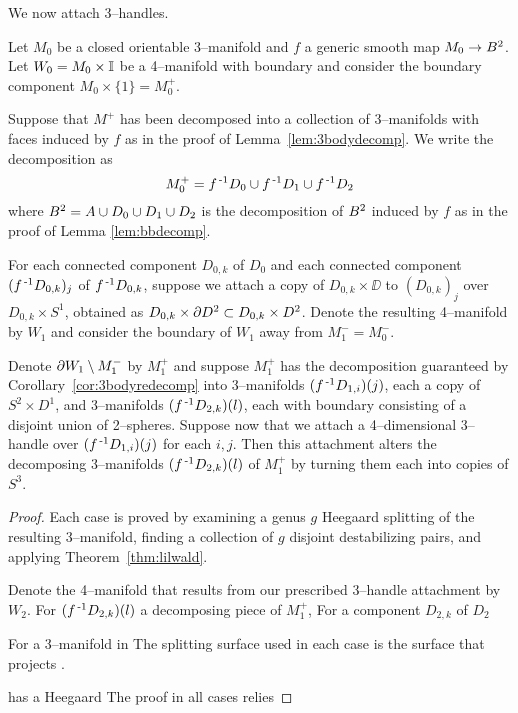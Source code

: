 We now attach 3--handles.

\begin{lem}
	\label{lem:3body3handle}
	Let $M_0$ be a closed orientable 3--manifold and $f$ a generic smooth map $M_0\to B^2$.
	Let $W_0=M_0\times\mathbb{I}$ be a 4--manifold with boundary and consider the boundary component $M_0\times\{1\}=M_0^+$.
	
	Suppose that $M^+$ has been decomposed into a collection of 3--manifolds with faces induced by $f$ as in the proof of Lemma~\ref{lem:3bodydecomp}.
	We write the decomposition as
	\[
	M_0^+ = f^{\,\text{-}1} D_0\cup f^{\,\text{-}1} D_1\cup f^{\,\text{-}1} D_2
	\]
	where $B^2=A\cup D_0\cup D_1\cup D_2$ is the decomposition of $B^2$ induced by $f$ as in the proof of Lemma \ref{lem:bbdecomp}.
	
	For each connected component $D_{0,k}$ of $D_0$ and each connected component $(f^{\,\text{-}1} D_{0,k})_j$ of $f^{\,\text{-}1} D_{0,k}$, suppose we attach a copy of $D_{0,k}\times\DD$ to $(D_{0,k})_j$ over $D_{0,k}\times S^1$, obtained as $D_{0,k}\times \partial D^2\subset D_{0,k}\times D^2$.
	Denote the resulting 4--manifold by $W_1$ and consider the boundary of $W_1$ away from $M_1^-=M_0^-$.
	
	Denote $\partial W_1\setminus M_1^-$ by $M_1^+$ and suppose $M_1^+$ has the decomposition guaranteed by Corollary~\ref{cor:3bodyredecomp} into 3--manifolds $(f^{\,\text{-}1} D_{1,i})(j)$, each a copy of $S^2\times D^1$, and 3--manifolds $(f^{\,\text{-}1} D_{2,k})(l)$, each with boundary consisting of a disjoint union of 2--spheres.
	Suppose now that we attach a 4--dimensional 3--handle over $(f^{\,\text{-}1} D_{1,i})(j)$ for each $i,j$.
	Then this attachment alters the decomposing 3--manifolds $(f^{\,\text{-}1} D_{2,k})(l)$ of $M_1^+$ by turning them each into copies of $S^3$.
\end{lem}

\begin{proof}
	Each case is proved by examining a genus $g$ Heegaard splitting of the resulting 3--manifold, finding a collection of $g$ disjoint destabilizing pairs, and applying Theorem~\ref{thm:lilwald}.
	
	Denote the 4--manifold that results from our prescribed 3--handle attachment by $W_2$.
	For $(f^{\,\text{-}1} D_{2,k})(l)$ a decomposing piece of $M_1^+$, 
	For a component $D_{2,k}$ of $D_{2}$
	
	For a 3--manifold in 
	The splitting surface used in each case is the surface that projects .
	
	has a Heegaard 
	The proof in all cases relies
	
	
\end{proof}















